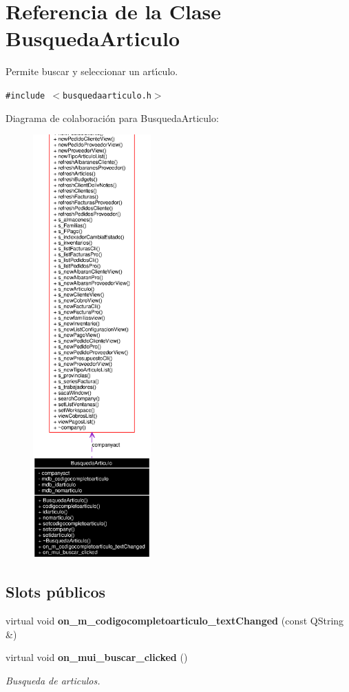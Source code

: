 \section{Referencia de la Clase Busqueda\-Articulo}
\label{classBusquedaArticulo}
Permite buscar y seleccionar un art\'{\i}culo.  


{\tt \#include $<$busquedaarticulo.h$>$}

Diagrama de colaboraci\'{o}n para Busqueda\-Articulo:\begin{figure}[H]
\begin{center}
\leavevmode
\includegraphics[width=128pt]{classBusquedaArticulo__coll__graph}
\end{center}
\end{figure}
\subsection*{Slots p\'{u}blicos}
\begin{CompactItemize}
\item 
virtual void {\bf on\_\-m\_\-codigocompletoarticulo\_\-text\-Changed} (const QString \&)\label{classBusquedaArticulo_i0}

\item 
virtual void {\bf on\_\-mui\_\-buscar\_\-clicked} ()\label{classBusquedaArticulo_i1}

\begin{CompactList}\small\item\em Busqueda de articulos. \item\end{CompactList}\end{CompactItemize}
